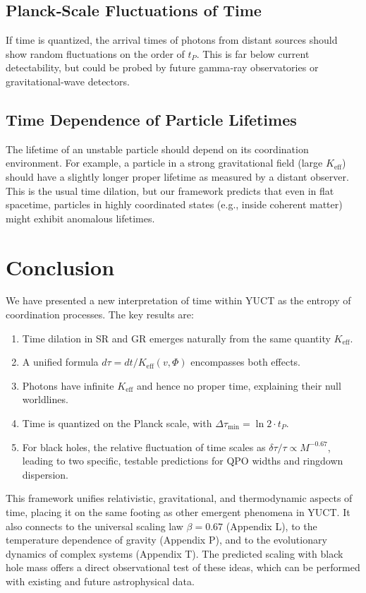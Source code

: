 \documentclass[12pt,a4paper]{article}
\newcommand{\Keff}{K_{\mathrm{eff}}}
\begin{document}
	\subsection{Planck‑Scale Fluctuations of Time}
	
	If time is quantized, the arrival times of photons from distant sources should show random fluctuations on the order of \(t_P\). This is far below current detectability, but could be probed by future gamma‑ray observatories or gravitational‑wave detectors.
	
	\subsection{Time Dependence of Particle Lifetimes}
	
	The lifetime of an unstable particle should depend on its coordination environment. For example, a particle in a strong gravitational field (large \(\Keff\)) should have a slightly longer proper lifetime as measured by a distant observer. This is the usual time dilation, but our framework predicts that even in flat spacetime, particles in highly coordinated states (e.g., inside coherent matter) might exhibit anomalous lifetimes.
	
	\section{Conclusion}
	
	We have presented a new interpretation of time within YUCT as the entropy of coordination processes. The key results are:
	\begin{enumerate}
		\item Time dilation in SR and GR emerges naturally from the same quantity \(\Keff\).
		\item A unified formula \(d\tau = dt/\Keff(v,\Phi)\) encompasses both effects.
		\item Photons have infinite \(\Keff\) and hence no proper time, explaining their null worldlines.
		\item Time is quantized on the Planck scale, with \(\Delta \tau_{\min} = \ln 2 \cdot t_P\).
		\item For black holes, the relative fluctuation of time scales as \(\delta\tau/\tau \propto M^{-0.67}\), leading to two specific, testable predictions for QPO widths and ringdown dispersion.
	\end{enumerate}
	
	This framework unifies relativistic, gravitational, and thermodynamic aspects of time, placing it on the same footing as other emergent phenomena in YUCT. It also connects to the universal scaling law \(\beta = 0.67\) (Appendix L), to the temperature dependence of gravity (Appendix P), and to the evolutionary dynamics of complex systems (Appendix T). The predicted scaling with black hole mass offers a direct observational test of these ideas, which can be performed with existing and future astrophysical data.
	
\end{document}
